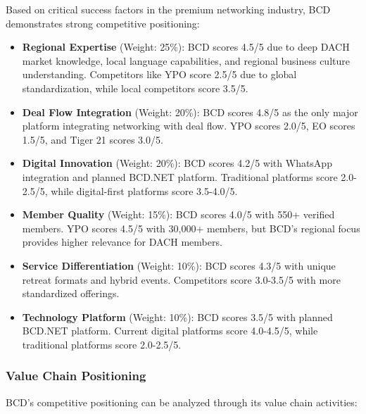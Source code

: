 Based on critical success factors in the premium networking industry, BCD demonstrates strong competitive positioning:

\begin{itemize}
    \item \textbf{Regional Expertise} (Weight: 25\%): BCD scores 4.5/5 due to deep DACH market knowledge, local language capabilities, and regional business culture understanding. Competitors like YPO score 2.5/5 due to global standardization, while local competitors score 3.5/5.
    
    \item \textbf{Deal Flow Integration} (Weight: 20\%): BCD scores 4.8/5 as the only major platform integrating networking with deal flow. YPO scores 2.0/5, EO scores 1.5/5, and Tiger 21 scores 3.0/5.
    
    \item \textbf{Digital Innovation} (Weight: 20\%): BCD scores 4.2/5 with WhatsApp integration and planned BCD.NET platform. Traditional platforms score 2.0-2.5/5, while digital-first platforms score 3.5-4.0/5.
    
    \item \textbf{Member Quality} (Weight: 15\%): BCD scores 4.0/5 with 550+ verified members. YPO scores 4.5/5 with 30,000+ members, but BCD's regional focus provides higher relevance for DACH members.
    
    \item \textbf{Service Differentiation} (Weight: 10\%): BCD scores 4.3/5 with unique retreat formats and hybrid events. Competitors score 3.0-3.5/5 with more standardized offerings.
    
    \item \textbf{Technology Platform} (Weight: 10\%): BCD scores 3.5/5 with planned BCD.NET platform. Current digital platforms score 4.0-4.5/5, while traditional platforms score 2.0-2.5/5.
\end{itemize}

\subsubsection{Value Chain Positioning}

BCD's competitive positioning can be analyzed through its value chain activities:

